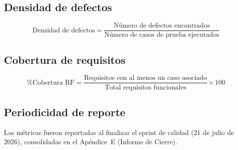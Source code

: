 \subsection{Densidad de defectos}
\label{subsec:densidad-defectos}

\[
\text{Densidad de defectos} = \frac{\text{Número de defectos encontrados}}{\text{Número de casos de prueba ejecutados}}
\]

\subsection{Cobertura de requisitos}
\label{subsec:cobertura-rf}

\[
\%\text{Cobertura RF} = \frac{\text{Requisitos con al menos un caso asociado}}{\text{Total requisitos funcionales}} \times 100
\]

\subsection{Periodicidad de reporte}
\label{subsec:periodicidad}

Las métricas fueron reportadas al finalizar el sprint de calidad (21 de julio de 2026), consolidadas en el Apéndice~E (Informe de Cierre).
